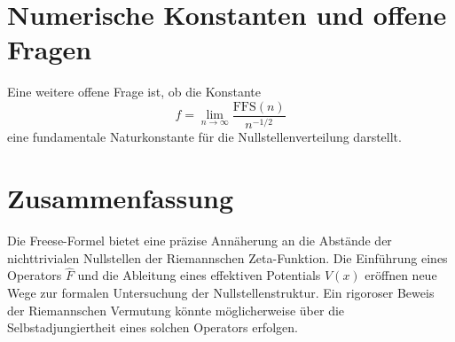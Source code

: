 \documentclass[a4paper,12pt]{article}
\begin{document}
\section{Numerische Konstanten und offene Fragen}

Eine weitere offene Frage ist, ob die Konstante
\begin{equation}
    f = \lim_{n\to\infty} \frac{\text{FFS}(n)}{n^{-1/2}}
\end{equation}
eine fundamentale Naturkonstante für die Nullstellenverteilung darstellt.

\section{Zusammenfassung}

Die Freese-Formel bietet eine präzise Annäherung an die Abstände der nichttrivialen Nullstellen der Riemannschen Zeta-Funktion. Die Einführung eines Operators $\hat{F}$ und die Ableitung eines effektiven Potentials $V(x)$ eröffnen neue Wege zur formalen Untersuchung der Nullstellenstruktur. Ein rigoroser Beweis der Riemannschen Vermutung könnte möglicherweise über die Selbstadjungiertheit eines solchen Operators erfolgen.
\end{document}
